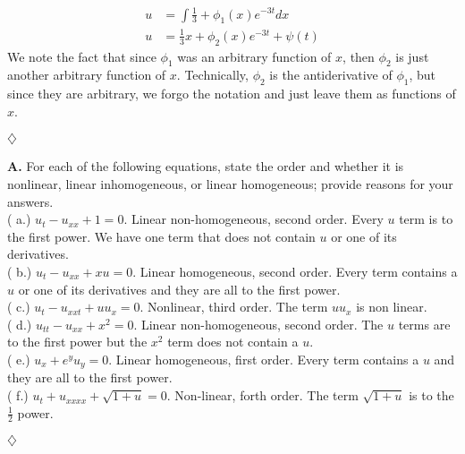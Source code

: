 \documentclass{article}
\begin{document}
\begin{align*}
u &= \int \frac{1}{3} + \phi_{1}(x)e^{-3t} dx  \\
u &= \frac{1}{3}x + \phi_2(x)e^{-3t} +\psi(t) 
\end{align*}
We note the fact that since \( \phi_1 \) was an arbitrary function of \(x\), then \( \phi_2	\) is just another arbitrary function of \(x\). Technically, \(\phi_2\) is the antiderivative of \(\phi_1\), but since they are arbitrary, we forgo the notation and just leave them as functions of \(x\). 
\begin{flushright}
\( \diamondsuit \) 
\end{flushright}

\newpage   

\noindent
\textbf{A.} For each of the following equations, state the order and whether it is nonlinear, linear inhomogeneous, or linear homogeneous; provide reasons for your answers. 
\vspace{3mm}
\\
\noindent
( a.) \(  u_t-u_{xx} + 1 = 0         \). Linear non-homogeneous, second order. Every \(u\) term is to the first power. We have one term that does not contain \(u\) or one of its derivatives.\\

\noindent
( b.) \(  u_t-u_{xx} + xu = 0          \). Linear homogeneous, second order. Every term contains a \(u\) or one of its derivatives and they are all to the first power. \\ 

\noindent
( c.) \(   u_t-u_{xxt} + uu_x = 0         \). Nonlinear, third order.  The term \( uu_x\) is non linear.\\

\noindent
( d.) \(   u_{tt}-u_{xx} + x^2 = 0         \). Linear non-homogeneous, second order.  The \(u\) terms are to the first power but the \(x^2\) term does not contain a \(u\).  \\

\noindent
( e.) \(    u_{x}+ e^yu_{y} = 0        \). Linear homogeneous, first order. Every term contains a \(u\) and they are all to the first power. \\

\noindent
( f.) \(     u_t+u_{xxxx} + \sqrt{1+u} = 0       \). Non-linear, forth order. The term \(\sqrt{1+u} \) is to the \( \frac{1}{2} \) power. 
\begin{flushright}
\( \diamondsuit \) 
\end{flushright}
\end{document}
